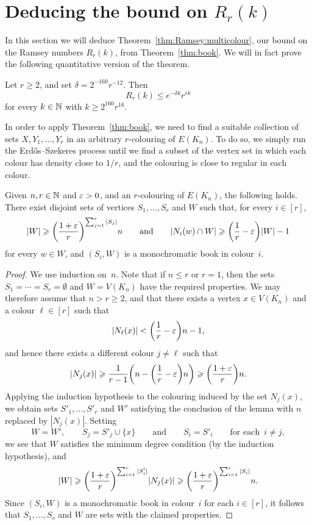 \section{Deducing the bound on $R_r(k)$}\label{sec:final:proof}

In this section we will deduce Theorem~\ref{thm:Ramsey:multicolour}, our bound on the Ramsey numbers $R_r(k)$, from Theorem~\ref{thm:book}. We will in fact prove the following quantitative version of the theorem.

\begin{theorem}\label{thm:Ramsey:multicolour:quant}
Let $r \ge 2$, and set $\delta = 2^{-160} r^{-12}$. Then
$$R_r(k) \le e^{-\delta k} r^{rk}$$ 
for every $k \in \mathbb{N}$ with $k \ge 2^{160} r^{16}$. 
\end{theorem}

In order to apply Theorem~\ref{thm:book}, we need to find a suitable collection of sets $X,Y_1,\ldots,Y_r$ in an arbitrary $r$-colouring of $E(K_n)$. To do so, we simply run the Erd\H{o}s--Szekeres process until we find a subset of the vertex set in which each colour has density close to $1/r$, and the colouring is close to regular in each colour. %

\begin{lemma}\label{lem:ESz:steps}
Given\/ $n,r \in \mathbb{N}$ and\/ $\varepsilon > 0$, and an $r$-colouring of $E(K_n)$, the following holds. There exist disjoint sets of vertices\/ $S_1,\dots,S_r$ and\/ $W$ such that, for every $i \in [r]$, 
$$|W| \geqslant \bigg( \frac{1+\varepsilon}{r} \bigg)^{\sum_{j = 1}^r |S_j|} n \qquad \text{and} \qquad |N_i(w) \cap W| \geqslant \bigg( \frac{1}{r} - \varepsilon \bigg) |W| - 1$$ 
for every $w \in W$, and $(S_i,W)$ is a monochromatic book in colour~$i$.
\end{lemma}

\begin{proof}
We use induction on~$n$. Note that if $n \le r$ or $r = 1$, then the sets $S_1 = \cdots = S_r = \emptyset$ and $W = V(K_n)$ have the required properties. We may therefore assume that $n > r \ge 2$, and that there exists a vertex $x \in V(K_n)$ and a colour $\ell \in [r]$ such that
$$|N_\ell(x)| < \bigg( \frac{1}{r} - \varepsilon \bigg) n - 1,$$
and hence there exists a different colour $j \ne \ell$ such that 
$$|N_j(x)| \geqslant \frac{1}{r-1} \bigg( n - \bigg( \frac{1}{r} - \varepsilon \bigg) n \bigg) \geqslant \bigg( \frac{1 + \varepsilon}{r} \bigg) n.$$
Applying the induction hypothesis to the colouring induced by the set $N_j(x)$, we obtain sets $S'_1,\ldots,S'_r$ and $W'$ satisfying the conclusion of the lemma with $n$ replaced by $|N_j(x)|$. Setting 
$$W = W', \qquad S_j = S'_j \cup \{x\} \qquad \text{and} \qquad S_i = S'_i \qquad \text{for each } \, i \ne j,$$ 
we see that $W$ satisfies the minimum degree condition (by the induction hypothesis), and
$$|W| \geqslant \bigg( \frac{1+\varepsilon}{r} \bigg)^{\sum_{i = 1}^r |S'_i|}|N_j(x)| \geqslant \bigg( \frac{1+\varepsilon}{r} \bigg)^{\sum_{i=1}^r |S_i|}n.$$
Since $(S_i,W)$ is a monochromatic book in colour~$i$ for each $i \in [r]$, it follows that $S_1,\dots,S_r$ and $W$ are sets with the claimed properties.
\end{proof}

